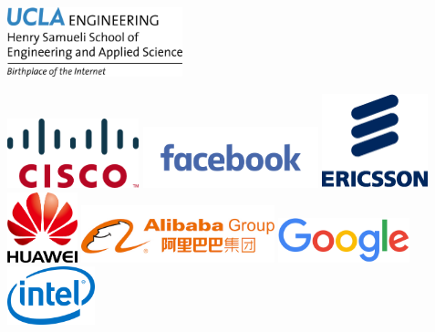 \documentclass[sigconf]{acmart}
\begin{document}
\begin{center}

\includegraphics[width=2in]{ucla-hsseas.jpg}

\hspace{0.2in}
\includegraphics[width=1.5in]{cisco.png}
\hspace{0.2in}
\includegraphics[width=2in]{facebook.png}
\hspace{0.2in}
\includegraphics[width=1.2in]{ericsson.png}
\\[0.5cm]

\hspace{0.2in}
\includegraphics[width=0.8in]{huawei.png}
\hspace{0.2in}
\includegraphics[width=2.2in]{alibaba.jpg}
\hspace{0.2in}
\includegraphics[width=1.5in]{google.png}
\hspace{0.2in}
\includegraphics[width=1in]{intel.png}
\\[0.8cm]


\end{center}
\end{document}
